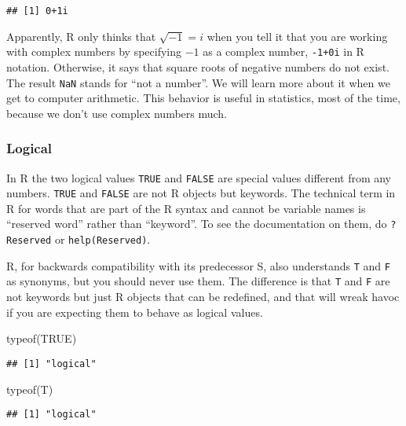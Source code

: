 \documentclass[
]{article}
\newenvironment{Shaded}{\begin{snugshade}}{\end{snugshade}}
\newcommand{\ConstantTok}[1]{\textcolor[rgb]{0.00,0.00,0.00}{#1}}
\newcommand{\FunctionTok}[1]{\textcolor[rgb]{0.00,0.00,0.00}{#1}}
\newcommand{\NormalTok}[1]{#1}
\begin{document}
\begin{verbatim}
## [1] 0+1i
\end{verbatim}

Apparently, R only thinks that \(\sqrt{- 1} = i\) when you tell it that
you are working with complex numbers by specifying \(- 1\) as a complex
number, \texttt{-1+0i} in R notation. Otherwise, it says that square
roots of negative numbers do not exist. The result \texttt{NaN} stands
for ``not a number''. We will learn more about it when we get to
computer arithmetic. This behavior is useful in statistics, most of the
time, because we don't use complex numbers much.

\hypertarget{logical}{%
\subsubsection{Logical}\label{logical}}

In R the two logical values \texttt{TRUE} and \texttt{FALSE} are special
values different from any numbers. \texttt{TRUE} and \texttt{FALSE} are
not R objects but keywords. The technical term in R for words that are
part of the R syntax and cannot be variable names is ``reserved word''
rather than ``keyword''. To see the documentation on them, do
\texttt{?Reserved} or \texttt{help(Reserved)}.

R, for backwards compatibility with its predecessor S, also understands
\texttt{T} and \texttt{F} as synonyms, but you should never use them.
The difference is that \texttt{T} and \texttt{F} are not keywords but
just R objects that can be redefined, and that will wreak havoc if you
are expecting them to behave as logical values.

\begin{Shaded}
\begin{Highlighting}[]
\FunctionTok{typeof}\NormalTok{(}\ConstantTok{TRUE}\NormalTok{)}
\end{Highlighting}
\end{Shaded}

\begin{verbatim}
## [1] "logical"
\end{verbatim}

\begin{Shaded}
\begin{Highlighting}[]
\FunctionTok{typeof}\NormalTok{(T)}
\end{Highlighting}
\end{Shaded}

\begin{verbatim}
## [1] "logical"
\end{verbatim}
\end{document}
